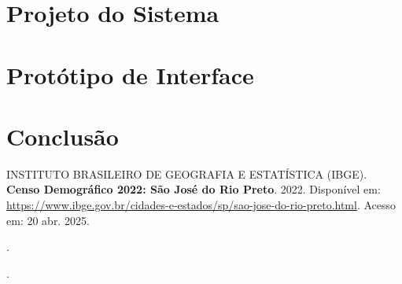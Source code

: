 \documentclass[a4paper, 12pt]{article}
\begin{document}
\section{Projeto do Sistema}

\newpage
\section{Protótipo de Interface}

\newpage
\section{Conclusão}

\newpage
\renewcommand{\refname}{Bibliografia}
\begin{thebibliography}{09}
 INSTITUTO BRASILEIRO DE GEOGRAFIA E ESTATÍSTICA (IBGE). 
\textbf{Censo Demográfico 2022: São José do Rio Preto}. 
2022. 
Disponível em: \url{https://www.ibge.gov.br/cidades-e-estados/sp/sao-jose-do-rio-preto.html}. 
Acesso em: 20 abr. 2025.

\bibitem{} %
\textbf{}. %

\bibitem{} %
\textbf{}. %

\end{thebibliography}
\end{document}
